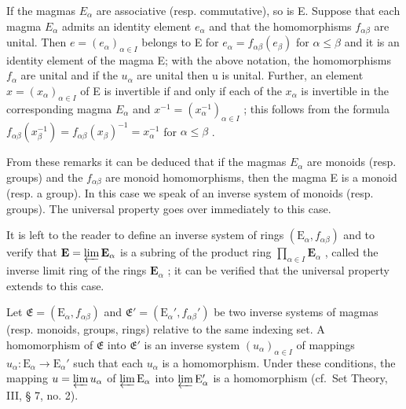 If the magmas \(E_{\alpha}\) are associative (resp. commutative), so is E. Suppose that each magma \(E_{\alpha}\) admits an identity element \(e_{\alpha}\) and that the homomorphisms \(f_{\alpha\beta}\) are unital. Then \(e = (e_{\alpha})_{\alpha \in I}\) belongs to E for \(e_{\alpha} = f_{\alpha\beta}(e_{\beta})\) for \(\alpha \leqslant \beta\) and it is an identity element of the magma E; with the above notation, the homomorphisms \(f_{\alpha}\) are unital and if the \(u_{\alpha}\) are unital then u is unital. Further, an element \(x = (x_{\alpha})_{\alpha \in I}\) of E is invertible if and only if each of the \(x_{\alpha}\) is invertible in the corresponding magma \(E_{\alpha}\) and \(x^{-1} = (x_{\alpha}^{-1})_{\alpha \in I}\) ; this follows from the formula \(f_{\alpha\beta}(x_{\beta}^{-1}) = f_{\alpha\beta}(x_{\beta})^{-1} = x_{\alpha}^{-1}\) for \(\alpha \leqslant \beta\) .

From these remarks it can be deduced that if the magmas \(E_{\alpha}\) are monoids (resp. groups) and the \(f_{\alpha\beta}\) are monoid homomorphisms, then the magma E is a monoid (resp. a group). In this case we speak of an inverse system of monoids (resp. groups). The universal property goes over immediately to this case.

It is left to the reader to define an inverse system of rings \((\mathrm{E}_{\alpha}, f_{\alpha \beta})\) and to verify that \(\mathbf{E} = \varprojlim \mathbf{E}_{\alpha}\) is a subring of the product ring \(\prod_{\alpha \in I} \mathbf{E}_{\alpha}\) , called the inverse limit ring of the rings \(\mathbf{E}_{\alpha}\) ; it can be verified that the universal property extends to this case.

Let \(\mathfrak{E} = (\mathrm{E}_{\alpha}, f_{\alpha\beta})\) and \(\mathfrak{E}' = (\mathrm{E}_{\alpha}', f_{\alpha\beta}')\) be two inverse systems of magmas (resp. monoids, groups, rings) relative to the same indexing set. A homomorphism of \(\mathfrak{E}\) into \(\mathfrak{E}'\) is an inverse system \((u_{\alpha})_{\alpha \in I}\) of mappings \(u_{\alpha}: \mathrm{E}_{\alpha} \to \mathrm{E}_{\alpha}'\) such that each \(u_{\alpha}\) is a homomorphism. Under these conditions, the mapping \(u = \varprojlim u_{\alpha}\) of \(\varprojlim \mathrm{E}_{\alpha}\) into \(\varprojlim \mathrm{E}_{\alpha}'\) is a homomorphism (cf.~Set Theory, III, § 7, no. 2).

